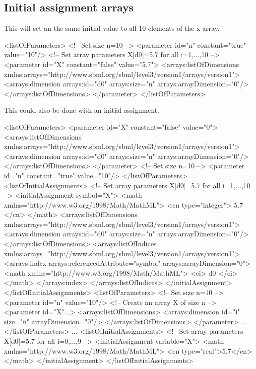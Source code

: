 \subsection{Initial assignment arrays}

This will set an the same initial value to all 10 elements of the x array.

\begin{example}
<listOfParameters>
    <!-- Set size n=10 -->
    <parameter id="n" constant="true" value="10"/>
    <!-- Set array parameters X[d0]=5.7 for all i=1,...,10 -->
    <parameter id="X" constant="false" value="5.7">
        <arrays:listOfDimensions
            xmlns:arrays="http://www.sbml.org/sbml/level3/version1/arrays/version1">
            <arrays:dimension arrays:id="d0" arrays:size="n" arrays:arrayDimension="0"/>
        </arrays:listOfDimensions>
    </parameter>
</listOfParameters>
\end{example}

This could also be done with an initial assignment.

\begin{example}
<listOfParameters>
    <parameter id="X" constant="false" value="0">
        <arrays:listOfDimensions
            xmlns:arrays="http://www.sbml.org/sbml/level3/version1/arrays/version1">
            <arrays:dimension arrays:id="d0" arrays:size="n" arrays:arrayDimension="0"/>
        </arrays:listOfDimensions>
    </parameter>
    <!-- Set size n=10 -->
    <parameter id="n" constant="true" value="10"/>
</listOfParameters>
<listOfInitialAssignments>
     <!-- Set array parameters X[d0]=5.7 for all i=1,...,10 -->
    <initialAssignment symbol="X">
        <math xmlns="http://www.w3.org/1998/Math/MathML">
            <cn type="integer"> 5.7 </cn>
        </math>
        <arrays:listOfDimensions
            xmlns:arrays="http://www.sbml.org/sbml/level3/version1/arrays/version1">
            <arrays:dimension arrays:id="d0" arrays:size="n" arrays:arrayDimension="0"/>
        </arrays:listOfDimensions>
        <arrays:listOfIndices
            xmlns:arrays="http://www.sbml.org/sbml/level3/version1/arrays/version1">
            <arrays:index arrays:referencedAttribute="symbol" arrays:arrayDimension="0">
                <math xmlns="http://www.w3.org/1998/Math/MathML">
                    <ci> d0 </ci>
                </math>
            </arrays:index>
        </arrays:listOfIndices>
    </initialAssignment>
</listOfInitialAssignments>
<listOfParameters> 
  <!-- Set size n=10 -->
  <parameter id="n" value="10"/>
  <!-- Create an array X of size n -->
  <parameter id="X"...>
    <arrays:listOfDimensions>
      <arrays:dimension id="i" size="n" arrayDimension="0"/> 
    </arrays:listOfDimensions>
  </parameter> ...
</listOfParameters> ...
<listOfInitialAssignments>
  <!-- Set array parameters X[d0]=5.7 for all i=0,...,9 -->
  <initialAssignment variable="X">
    <math xmlns="http://www.w3.org/1998/Math/MathML">
      <cn type="real">5.7</cn>
    </math>
  </initialAssignment>
</listOfInitialAssignments>
\end{example}

